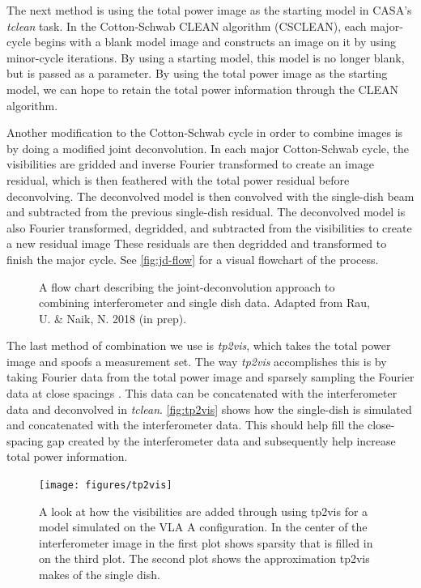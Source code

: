 \documentclass[manuscript,linenumbers]{aastex62}
\begin{document}
The next method is using the total power image as the starting model in CASA's \textit{tclean} task. In the Cotton-Schwab CLEAN algorithm (CSCLEAN), each major-cycle begins with a blank model image and constructs an image on it by using minor-cycle iterations. By using a starting model, this model is no longer blank, but is passed as a parameter. By using the total power image as the starting model, we can hope to retain the total power information through the CLEAN algorithm.

Another modification to the Cotton-Schwab cycle in order to combine images is by doing a modified joint deconvolution. In each major Cotton-Schwab cycle, the visibilities are gridded and inverse Fourier transformed to create an image residual, which is then feathered with the total power residual before deconvolving. The deconvolved model is then convolved with the single-dish beam and subtracted from the previous single-dish residual. The deconvolved model is also Fourier transformed, degridded, and subtracted from the visibilities to create a new residual image These residuals are then degridded and transformed to finish the major cycle. See \autoref{fig:jd-flow} for a visual flowchart of the process.

\begin{figure}[t]
    \caption{A flow chart describing the joint-deconvolution approach to combining interferometer and single dish data. Adapted from Rau, U. \& Naik, N. 2018 (in prep).}
    \label{fig:jd-flow}
\end{figure}

The last method of combination we use is \textit{tp2vis}, which takes the total power image and spoofs a measurement set. The way \textit{tp2vis} accomplishes this is by taking Fourier data from the total power image and sparsely sampling the Fourier data at close spacings \citep[see][]{2011ApJS..193...19K}. This data can be concatenated with the interferometer data and deconvolved in \textit{tclean}. \autoref{fig:tp2vis} shows how the single-dish is simulated and concatenated with the interferometer data. This should help fill the close-spacing gap created by the interferometer data and subsequently help increase total power information.

\begin{figure}[t]
    \texttt{[image: figures/tp2vis]}
    \caption{A look at how the visibilities are added through using tp2vis for a model simulated on the VLA A configuration. In the center of the interferometer image in the first plot shows sparsity that is filled in on the third plot. The second plot shows the approximation tp2vis makes of the single dish.}
    \label{fig:tp2vis}
\end{figure}
\end{document}
